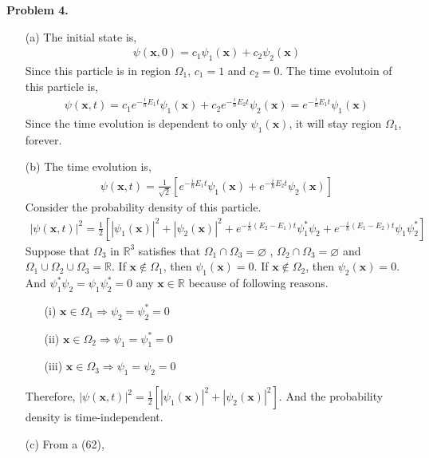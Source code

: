 \documentclass[aps,floatfix,nofootinbib,superscriptaddress,fleqn]{revtex4}
\begin{document}
  \noindent \textbf{Problem 4.}
  \begin{itemize}
    \item[(a)] The initial state is,
    \begin{align}
      \psi(\bm{x},0) = c_1\psi_1(\bm{x})+c_2\psi_2(\bm{x})
    \end{align} 
    Since this particle is in region $\Omega_1$, $c_1=1$ and $c_2=0$. The time evolutoin of this particle is,
    \begin{align}
      \psi(\bm{x},t) = c_1e^{-\frac{i}{\hbar}E_1t}\psi_1(\bm{x})+c_2e^{-\frac{i}{\hbar}E_2t}\psi_2(\bm{x}) = e^{-\frac{i}{\hbar}E_1t}\psi_1(\bm{x})
    \end{align}
    Since the time evolution is dependent to only $\psi_1(\bm{x})$, it will stay region $\Omega_1$, forever.
    \item[(b)]
    The time evolution is,
    \begin{align}
      \psi(\bm{x},t) = \frac{1}{\sqrt{2}}\left[ e^{-\frac{i}{\hbar}E_1t}\psi_1(\bm{x})+e^{-\frac{i}{\hbar}E_2t}\psi_2(\bm{x}) \right]
    \end{align}
    Consider the probability density of this particle.
    \begin{align}
      |\psi(\bm{x},t)|^2 = \frac{1}{2}\left[|\psi_1(\bm{x})|^2 + |\psi_2(\bm{x})|^2+e^{-\frac{i}{\hbar}(E_2-E_1)t}\psi_1^*\psi_2+e^{-\frac{i}{\hbar}(E_1-E_2)t}\psi_1\psi_2^*  \right]
    \end{align}
    Suppose that $\Omega_3$ in $\mathbb{R}^3 $ satisfies that $\Omega_1 \cap \Omega_3 = \varnothing$ , $\Omega_2 \cap \Omega_3 = \varnothing$ and $\Omega_1\cup \Omega_2\cup \Omega_3 = \mathbb{R}$.
    If $\bm{x}\notin\Omega_1$, then $\psi_1(\bm{x})=0$. If $\bm{x}\notin\Omega_2$, then $\psi_2(\bm{x})=0$. And $\psi_1^*\psi_2=\psi_1\psi_2^*=0$ any $\bm{x}\in \mathbb{R}$ because of following reasons.
    \begin{itemize}
      \item[(i)] $\bm{x}\in\Omega_1 \Longrightarrow \psi_2 = \psi^*_2 = 0$
      \item[(ii)] $\bm{x}\in\Omega_2 \Longrightarrow \psi_1 = \psi^*_1 = 0$
      \item[(iii)] $\bm{x}\in\Omega_3 \Longrightarrow \psi_1 = \psi_2 = 0$
    \end{itemize}
    Therefore, $|\psi(\bm{x},t)|^2 = \frac{1}{2}\left[ |\psi_1(\bm{x})|^2+|\psi_2(\bm{x})|^2 \right]$. And the probability density is time-independent.
    \item[(c)] From a (62),
      \begin{align*}

\end{align*}
\end{itemize}
\end{document}
